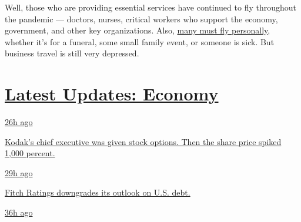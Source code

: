 Well, those who are providing essential services have continued to fly
throughout the pandemic --- doctors, nurses, critical workers who
support the economy, government, and other key organizations. Also,
\href{https://www.nytimes.com/2020/06/09/business/flying-coronovirus.html}{many
must fly personally}, whether it's for a funeral, some small family
event, or someone is sick. But business travel is still very depressed.

\hypertarget{latest-updates-economy}{%
\section{\texorpdfstring{\href{https://www.nytimes.com/live/2020/07/31/business/stock-market-today-coronavirus?action=click\&pgtype=Article\&state=default\&region=MAIN_CONTENT_1\&context=storylines_live_updates}{Latest
Updates:
Economy}}{Latest Updates: Economy}}\label{latest-updates-economy}}

\href{https://www.nytimes.com/live/2020/07/31/business/stock-market-today-coronavirus?action=click\&pgtype=Article\&state=default\&region=MAIN_CONTENT_1\&context=storylines_live_updates\#kodaks-chief-executive-was-given-stock-options-then-the-share-price-spiked-1000-percent}{26h
ago}

\href{https://www.nytimes.com/live/2020/07/31/business/stock-market-today-coronavirus?action=click\&pgtype=Article\&state=default\&region=MAIN_CONTENT_1\&context=storylines_live_updates\#kodaks-chief-executive-was-given-stock-options-then-the-share-price-spiked-1000-percent}{Kodak's
chief executive was given stock options. Then the share price spiked
1,000 percent.}

\href{https://www.nytimes.com/live/2020/07/31/business/stock-market-today-coronavirus?action=click\&pgtype=Article\&state=default\&region=MAIN_CONTENT_1\&context=storylines_live_updates\#fitch-ratings-downgrades-its-outlook-on-us-debt}{29h
ago}

\href{https://www.nytimes.com/live/2020/07/31/business/stock-market-today-coronavirus?action=click\&pgtype=Article\&state=default\&region=MAIN_CONTENT_1\&context=storylines_live_updates\#fitch-ratings-downgrades-its-outlook-on-us-debt}{Fitch
Ratings downgrades its outlook on U.S. debt.}

\href{https://www.nytimes.com/live/2020/07/31/business/stock-market-today-coronavirus?action=click\&pgtype=Article\&state=default\&region=MAIN_CONTENT_1\&context=storylines_live_updates\#us-sanctions-more-chinese-officials-over-human-rights-violations-as-tensions-flare}{36h
ago}

